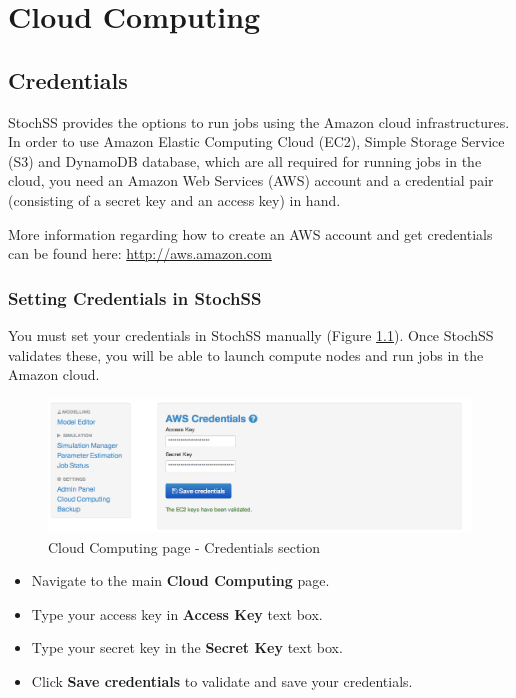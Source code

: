 \chapter{Cloud Computing}

\section{Credentials}
StochSS provides the options to run jobs using the Amazon cloud infrastructures. In order to use Amazon Elastic Computing Cloud (EC2), Simple Storage Service (S3) and DynamoDB database, which are all required for running jobs in the cloud, you need an Amazon Web Services (AWS) account and a credential pair (consisting of a secret key and an access key) in hand. 

More information regarding how to create an AWS account and get credentials can be found here: \url{http://aws.amazon.com}

\subsection{Setting Credentials in StochSS}
You must set your credentials in StochSS manually (Figure \ref{fig:1}). Once StochSS validates these, you will be able to launch compute nodes and run jobs in the Amazon cloud.

\begin{figure}[!ht]
\centering
\includegraphics[scale=0.45]{T6/T6_fig_credentials.png}
\caption{Cloud Computing page - Credentials section}
\label{fig:1}
\end{figure}

\begin{itemize}
\item Navigate to the main \textbf{Cloud Computing} page.
\item Type your access key in \textbf{Access Key} text box.
\item Type your secret key in the \textbf{Secret Key} text box. 
\item Click \textbf{Save credentials} to validate and save your credentials.
\end{itemize}

